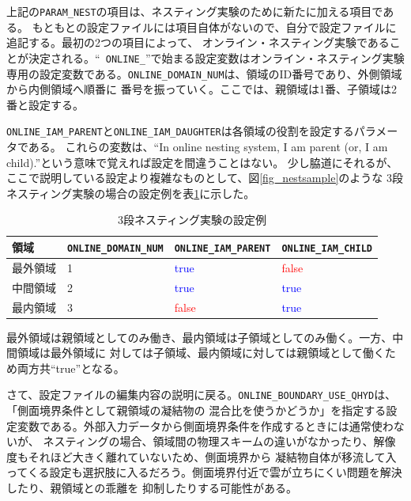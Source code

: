 \noindent 上記の\verb|PARAM_NEST|の項目は、ネスティング実験のために新たに加える項目である。
もともとの設定ファイルには項目自体がないので、自分で設定ファイルに追記する。最初の2つの項目によって、
オンライン・ネスティング実験であることが決定される。``\verb| ONLINE_|''で始まる設定変数はオンライン・ネスティング実験
専用の設定変数である。\verb|ONLINE_DOMAIN_NUM|は、領域のID番号であり、外側領域から内側領域へ順番に
番号を振っていく。ここでは、親領域は1番、子領域は2番と設定する。

\verb|ONLINE_IAM_PARENT|と\verb|ONLINE_IAM_DAUGHTER|は各領域の役割を設定するパラメータである。
これらの変数は、``In online nesting system, I am parent (or, I am child).''という意味で覚えれば設定を間違うことはない。
少し脇道にそれるが、ここで説明している設定より複雑なものとして、図\ref{fig_nestsample}のような
3段ネスティング実験の場合の設定例を表\ref{tab:triple_nested}に示した。

\begin{table}[htb]
\begin{center}
\caption{3段ネスティング実験の設定例}
\begin{tabularx}{150mm}{|l|l|l|X|} \hline
 \rowcolor[gray]{0.9} 領域 & \verb|ONLINE_DOMAIN_NUM| & \verb|ONLINE_IAM_PARENT| & \verb|ONLINE_IAM_CHILD|\\ \hline
 最外領域 & 1 & \textcolor{blue}{true} & \textcolor{red}{false} \\ \hline
 中間領域 & 2 & \textcolor{blue}{true} & \textcolor{blue}{true} \\ \hline
 最内領域 & 3 & \textcolor{red}{false} & \textcolor{blue}{true} \\ \hline
\end{tabularx}
\label{tab:triple_nested}
\end{center}
\end{table}

\noindent 最外領域は親領域としてのみ働き、最内領域は子領域としてのみ働く。一方、中間領域は最外領域に
対しては子領域、最内領域に対しては親領域として働くため両方共``true''となる。

さて、設定ファイルの編集内容の説明に戻る。\verb|ONLINE_BOUNDARY_USE_QHYD|は、「側面境界条件として親領域の凝結物の
混合比を使うかどうか」を指定する設定変数である。外部入力データから側面境界条件を作成するときには通常使わないが、
ネスティングの場合、領域間の物理スキームの違いがなかったり、解像度もそれほど大きく離れていないため、側面境界から
凝結物自体が移流して入ってくる設定も選択肢に入るだろう。側面境界付近で雲が立ちにくい問題を解決したり、親領域との乖離を
抑制したりする可能性がある。


